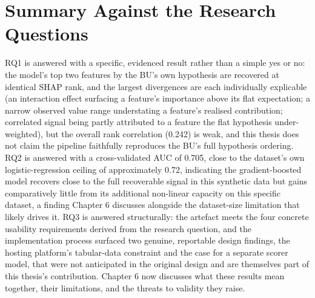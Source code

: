 \hypertarget{summary-against-the-research-questions}{%
\section{Summary Against the Research
Questions}\label{summary-against-the-research-questions}}

RQ1 is answered with a specific, evidenced result rather than a simple
yes or no: the model's top two features by the BU's own hypothesis are
recovered at identical SHAP rank, and the largest divergences are each
individually explicable (an interaction effect surfacing a feature's
importance above its flat expectation; a narrow observed value range
understating a feature's realised contribution; correlated signal being
partly attributed to a feature the flat hypothesis under-weighted), but
the overall rank correlation (0.242) is weak, and this thesis does not
claim the pipeline faithfully reproduces the BU's full hypothesis
ordering. RQ2 is answered with a cross-validated AUC of 0.705, close to
the dataset's own logistic-regression ceiling of approximately 0.72,
indicating the gradient-boosted model recovers close to the full
recoverable signal in this synthetic data but gains comparatively little
from its additional non-linear capacity on this specific dataset, a
finding Chapter 6 discusses alongside the dataset-size limitation that
likely drives it. RQ3 is answered structurally: the artefact meets the
four concrete usability requirements derived from the research question,
and the implementation process surfaced two genuine, reportable design
findings, the hosting platform's tabular-data constraint and the case
for a separate scorer model, that were not anticipated in the original
design and are themselves part of this thesis's contribution. Chapter 6
now discusses what these results mean together, their limitations, and
the threats to validity they raise.
